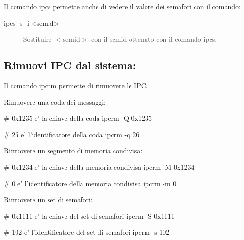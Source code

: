 Il comando {\ttfamily ipcs} permette anche di vedere il valore dei semafori con il comando\+: 
\begin{DoxyCode}
ipcs -s -i <semid>
\end{DoxyCode}
 \begin{quote}
Sostituire {\ttfamily $<$semid$>$} con il semid ottenuto con il comando {\ttfamily ipcs}. \end{quote}


\subsection*{Rimuovi I\+PC dal sistema\+:}

Il comando {\ttfamily ipcrm} permette di rimuovere le I\+PC.

Rimuovere una coda dei messaggi\+: 
\begin{DoxyCode}
# 0x1235 e' la chiave della coda
ipcrm -Q 0x1235

# 25 e' l'identificatore della coda
ipcrm -q 26
\end{DoxyCode}


Rimuovere un segmento di memoria condivisa\+: 
\begin{DoxyCode}
# 0x1234 e' la chiave della memoria condivisa
ipcrm -M 0x1234

# 0 e' l'identificatore della memoria condivisa
ipcrm -m 0
\end{DoxyCode}


Rimuovere un set di semafori\+: 
\begin{DoxyCode}
# 0x1111 e' la chiave del set di semafori
ipcrm -S 0x1111

# 102 e' l'identificatore del set di semafori
ipcrm -s 102
\end{DoxyCode}
 